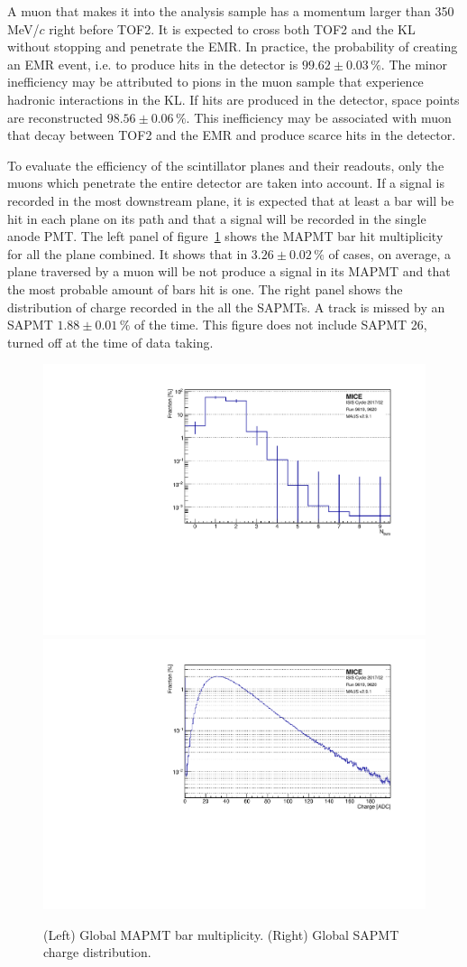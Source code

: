 A muon that makes it into the analysis sample has a momentum larger than 350\,MeV/$c$ right before TOF2. It is expected to cross both TOF2 and the KL without stopping and penetrate the EMR. In practice, the probability of creating an EMR event, i.e. to produce hits in the detector is $99.62\pm0.03\,\%$. The minor inefficiency may be attributed to pions in the muon sample that experience hadronic interactions in the KL. If hits are produced in the detector, space points are reconstructed $98.56\pm0.06\,\%$. This inefficiency may be associated with muon that decay between TOF2 and the EMR and produce scarce hits in the detector.

To evaluate the efficiency of the scintillator planes and their readouts, only the muons which penetrate the entire detector are taken into account. If a signal is recorded in the most downstream plane, it is expected that at least a bar will be hit in each plane on its path and that a signal will be recorded in the single anode PMT. The left panel of figure~\ref{fig:emr_eff} shows the MAPMT bar hit multiplicity for all the plane combined. It shows that in $3.26\pm0.02\,\%$ of cases, on average, a plane traversed by a muon will be not produce a signal in its MAPMT and that the most probable amount of bars hit is one. The right panel shows the distribution of charge recorded in the all the SAPMTs. A track is missed by an SAPMT $1.88\pm0.01\,\%$ of the time. This figure does not include SAPMT 26, turned off at the time of data taking.

\begin{figure}[htb!]
	\begin{center}
		\includegraphics[width=0.49\columnwidth]{nbars.pdf}
		\hfill
		\includegraphics[width=0.49\columnwidth]{charge.pdf}
		\caption{(Left) Global MAPMT bar multiplicity. (Right) Global SAPMT charge distribution.}
		\label{fig:emr_eff}
	\end{center}
\end{figure}

